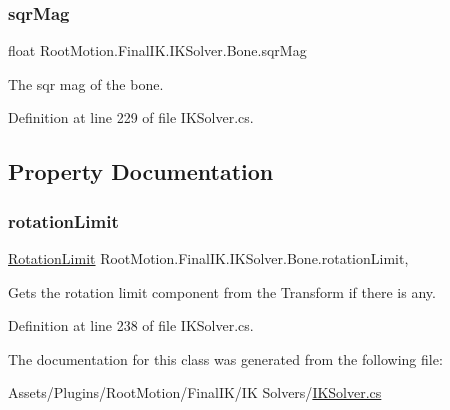 \subsubsection{\texorpdfstring{sqr\+Mag}{sqrMag}}
{\footnotesize\ttfamily float Root\+Motion.\+Final\+I\+K.\+I\+K\+Solver.\+Bone.\+sqr\+Mag}



The sqr mag of the bone. 



Definition at line 229 of file I\+K\+Solver.\+cs.



\subsection{Property Documentation}
\mbox{\label{class_root_motion_1_1_final_i_k_1_1_i_k_solver_1_1_bone_a569ab957aabad72b16e0b16004a648db}} 
\subsubsection{\texorpdfstring{rotation\+Limit}{rotationLimit}}
{\footnotesize\ttfamily \mbox{\hyperlink{class_root_motion_1_1_final_i_k_1_1_rotation_limit}{Rotation\+Limit}} Root\+Motion.\+Final\+I\+K.\+I\+K\+Solver.\+Bone.\+rotation\+Limit\hspace{0.3cm}{\ttfamily [get]}, {\ttfamily [set]}}



Gets the rotation limit component from the Transform if there is any. 



Definition at line 238 of file I\+K\+Solver.\+cs.



The documentation for this class was generated from the following file\+:\begin{DoxyCompactItemize}
\item 
Assets/\+Plugins/\+Root\+Motion/\+Final\+I\+K/\+I\+K Solvers/\mbox{\hyperlink{_i_k_solver_8cs}{I\+K\+Solver.\+cs}}\end{DoxyCompactItemize}
